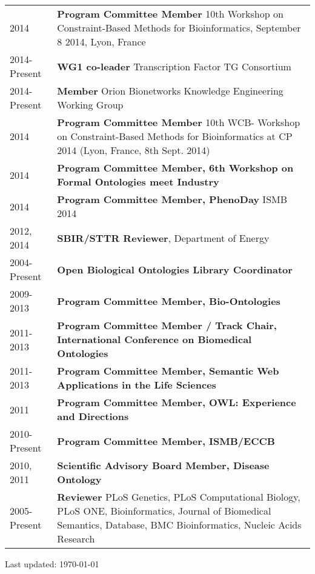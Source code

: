 \documentclass[11pt,fullpage]{article}
\begin{document}
\begin{longtable}{p{0.5in}|p{5.5in}}

2014  & \textbf{Program Committee Member}  10th Workshop on Constraint-Based Methods for Bioinformatics, September 8 2014, Lyon, France \\
2014-Present  & \textbf{WG1 co-leader} Transcription Factor TG Consortium \\
2014-Present  & \textbf{Member} Orion Bionetworks Knowledge Engineering Working Group \\
2014 & \textbf{Program Committee Member} 10th WCB- Workshop on Constraint-Based Methods for Bioinformatics at CP 2014 (Lyon, France, 8th Sept. 2014) \\
2014 & \textbf{Program Committee Member, 6th Workshop on Formal Ontologies meet Industry}\\
2014 & \textbf{Program Committee Member, PhenoDay} ISMB 2014\\
2012, 2014 & \textbf{SBIR/STTR Reviewer}, Department of Energy \\
2004-Present  & \textbf{Open Biological Ontologies Library Coordinator} \\
2009-2013  & \textbf{Program Committee Member, Bio-Ontologies} \\
2011-2013 & \textbf{Program Committee Member / Track Chair, International Conference on Biomedical Ontologies}\\
2011-2013 & \textbf{Program Committee Member, Semantic Web  Applications in the Life Sciences}\\
2011 & \textbf{Program Committee Member, OWL: Experience and Directions} \\
2010-Present & \textbf{Program Committee Member, ISMB/ECCB} \\
2010, 2011 & \textbf{Scientific Advisory Board Member, Disease Ontology} \\
2005-Present  & \textbf{Reviewer} PLoS Genetics, PLoS Computational
Biology, PLoS ONE, Bioinformatics, Journal of Biomedical
Semantics, Database, BMC Bioinformatics, Nucleic Acids Research\\

\end{longtable}







\bigskip
\begin{center}
  \begin{footnotesize}
    Last updated: \today
  \end{footnotesize}
\end{center}



\end{document}
